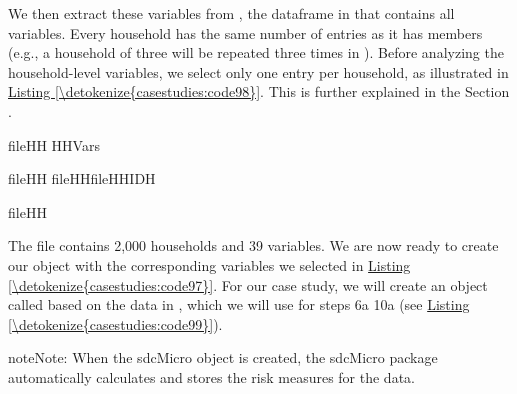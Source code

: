 \documentclass[letterpaper,10pt,english]{sphinxmanual}
\begin{document}
We then extract these variables from , the dataframe in  that
contains all variables. Every household has the same number of entries
as it has members (e.g., a household of three will be repeated three
times in ). Before analyzing the household-level variables, we
select only one entry per household, as illustrated in \hyperref[\detokenize{casestudies:code98}]{Listing \ref{\detokenize{casestudies:code98}}}. This
is further explained in the Section .

\def\sphinxLiteralBlockLabel{\label{\detokenize{casestudies:code98}}}
%
\begin{sphinxVerbatim}[commandchars=\\\{\},numbers=left,firstnumber=1,stepnumber=1]
fileHH  \PYG{p}{[}HHVars\PYG{p}{]}

fileHH  fileHH\PYG{p}{[}fileHHIDH\PYG{p}{]}

fileHH
\end{sphinxVerbatim}

The file  contains 2,000 households and 39 variables. We are now
ready to create our  object with the corresponding variables
we selected in \hyperref[\detokenize{casestudies:code97}]{Listing \ref{\detokenize{casestudies:code97}}}. For our case study, we will create an
 object called  based on the data in , which we
will use for steps 6a \textendash{} 10a (see \hyperref[\detokenize{casestudies:code99}]{Listing \ref{\detokenize{casestudies:code99}}}).

\begin{sphinxadmonition}{note}{Note:}
When the sdcMicro object is created, the sdcMicro package automatically calculates and
stores the risk measures for the data.
\end{sphinxadmonition}
\end{document}

